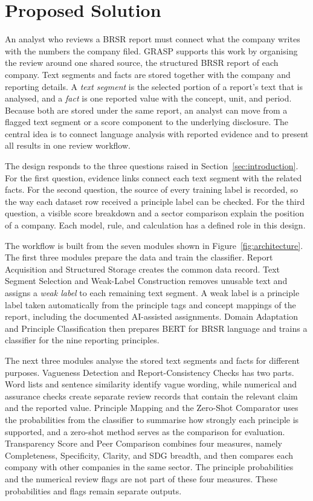 \section{Proposed Solution}
\label{sec:proposed}

An analyst who reviews a BRSR report must connect what the company writes with the numbers the company filed. GRASP supports this work by organising the review around one shared source, the structured BRSR report of each company. Text segments and facts are stored together with the company and reporting details. A \emph{text segment} is the selected portion of a report's text that is analysed, and a \emph{fact} is one reported value with the concept, unit, and period. Because both are stored under the same report, an analyst can move from a flagged text segment or a score component to the underlying disclosure. The central idea is to connect language analysis with reported evidence and to present all results in one review workflow.

The design responds to the three questions raised in Section~\ref{sec:introduction}. For the first question, evidence links connect each text segment with the related facts. For the second question, the source of every training label is recorded, so the way each dataset row received a principle label can be checked. For the third question, a visible score breakdown and a sector comparison explain the position of a company. Each model, rule, and calculation has a defined role in this design.

The workflow is built from the seven modules shown in Figure~\ref{fig:architecture}. The first three modules prepare the data and train the classifier. Report Acquisition and Structured Storage creates the common data record. Text Segment Selection and Weak-Label Construction removes unusable text and assigns a \emph{weak label} to each remaining text segment. A weak label is a principle label taken automatically from the principle tags and concept mappings of the report, including the documented AI-assisted assignments. Domain Adaptation and Principle Classification then prepares BERT for BRSR language and trains a classifier for the nine reporting principles.

The next three modules analyse the stored text segments and facts for different purposes. Vagueness Detection and Report-Consistency Checks has two parts. Word lists and sentence similarity identify vague wording, while numerical and assurance checks create separate review records that contain the relevant claim and the reported value. Principle Mapping and the Zero-Shot Comparator uses the probabilities from the classifier to summarise how strongly each principle is supported, and a zero-shot method serves as the comparison for evaluation. Transparency Score and Peer Comparison combines four measures, namely Completeness, Specificity, Clarity, and SDG breadth, and then compares each company with other companies in the same sector. The principle probabilities and the numerical review flags are not part of these four measures. These probabilities and flags remain separate outputs.

